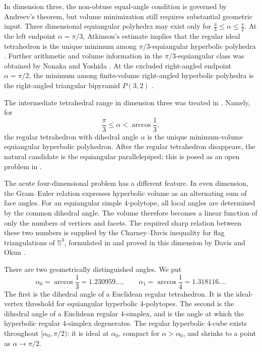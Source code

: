 \documentclass[12pt,a4paper]{article}
\theoremstyle{thmstyleone}
\theoremstyle{thmstylethree}
\theoremstyle{thmstyletwo}
\newcommand{\SSph}{\mathbb S}
\begin{document}
In dimension three, the non-obtuse equal-angle condition is governed by
Andreev's theorem, but volume minimization still requires substantial
geometric input. Three dimensional equiangular polyhedra may exist only for
$\frac{\pi}{3}\le \alpha\le \frac{\pi}{2}$.  At the left endpoint $\alpha=\pi/3$, Atkinson's estimate
implies that the regular ideal tetrahedron is the unique minimum among
$\pi/3$-equiangular hyperbolic polyhedra \cite{Atkinson2009}.  Further
arithmetic and volume information in the $\pi/3$-equiangular class was
obtained by Nonaka and Yoshida \cite{NonakaYoshida2026}.  At the excluded
right-angled endpoint $\alpha=\pi/2$, the minimum among finite-volume
right-angled hyperbolic polyhedra is the right-angled triangular bipyramid
$P(3,2)$ \cite{VesninEgorov2025}.

The intermediate tetrahedral range in dimension three was treated in
\cite{Egorov2026}.  Namely, for
\[
 \frac{\pi}{3}\leq\alpha<\arccos\frac13,
\]
the regular tetrahedron with dihedral angle $\alpha$ is the unique
minimum-volume equiangular hyperbolic polyhedron.  After the regular
tetrahedron disappears, the natural candidate is the equiangular
parallelepiped; this is posed as an open problem in \cite{Egorov2026}.

The acute four-dimensional problem has a different feature.  In even dimension,
the Gram--Euler relation expresses hyperbolic volume as an alternating sum of
face angles.  For an equiangular simple $4$-polytope, all local angles are
determined by the common dihedral angle.  The volume therefore becomes a
linear function of only the numbers of vertices and facets.  The required
sharp relation between these two numbers is supplied by the
Charney--Davis inequality for flag triangulations of $\SSph^3$, formulated
in \cite{CharneyDavis1993} and proved in this dimension by Davis and Okun
\cite{DavisOkun2001}.

There are two geometrically distinguished angles.  We put
\begin{equation}\label{eq:critical-angles}
 \alpha_0=\arccos\frac13=1.230959\ldots,
 \qquad
 \alpha_1=\arccos\frac14=1.318116\ldots.
\end{equation}
The first is the dihedral angle of a Euclidean regular tetrahedron.  It is
the ideal-vertex threshold for equiangular hyperbolic $4$-polytopes.  The
second is the dihedral angle of a Euclidean regular $4$-simplex, and is the
angle at which the hyperbolic regular $4$-simplex degenerates.  The regular
hyperbolic $4$-cube exists throughout
$[\alpha_0,\pi/2)$: it is ideal at $\alpha_0$, compact for
$\alpha>\alpha_0$, and shrinks to a point as $\alpha\to\pi/2$.
\end{document}
